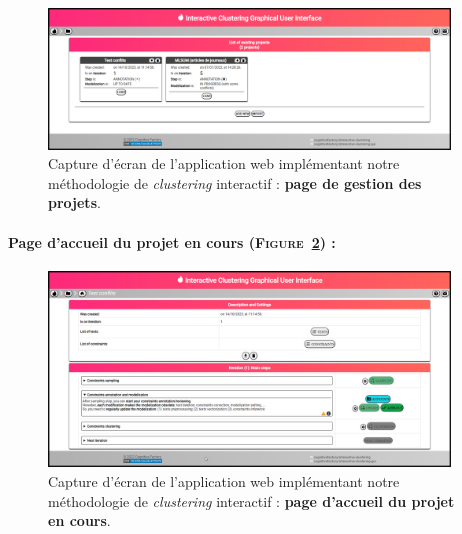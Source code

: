 		\begin{figure}[H]
			\centering
			\includegraphics[width=0.95\textwidth]{figures/interactive-clustering-application-liste-projets}
			\caption{
				Capture d'écran de l'application web implémentant notre méthodologie de \textit{clustering} interactif : \textbf{page de gestion des projets}.
			}
			\label{figure:C-WEB-APPLICATION-LISTE-PROJETS}
		\end{figure}
	
	
	\newpage
	\paragraph{Page d'accueil du projet en cours (\textsc{Figure~\ref{figure:C-WEB-APPLICATION-ACCUEIL-PROJET}}) :}
	
		\begin{figure}[H]
			\centering
			\includegraphics[width=0.95\textwidth]{figures/interactive-clustering-application-accueil-projet}
			\caption{
				Capture d'écran de l'application web implémentant notre méthodologie de \textit{clustering} interactif : \textbf{page d'accueil du projet en cours}.
			}
			\label{figure:C-WEB-APPLICATION-ACCUEIL-PROJET}
		\end{figure}
	
	
	\newpage
